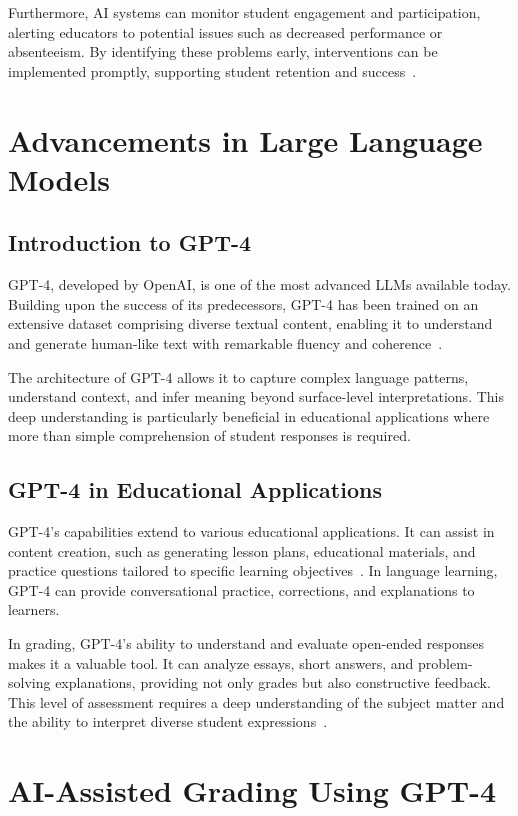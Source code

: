 \documentclass[ms,twoside,print]{nuthesis}
\begin{document}
Furthermore, AI systems can monitor student engagement and participation, alerting educators to potential issues such as decreased performance or absenteeism. By identifying these problems early, interventions can be implemented promptly, supporting student retention and success~\cite{Zawacki2021}.

\section{Advancements in Large Language Models}

\subsection{Introduction to GPT-4}

GPT-4, developed by OpenAI, is one of the most advanced LLMs available today. Building upon the success of its predecessors, GPT-4 has been trained on an extensive dataset comprising diverse textual content, enabling it to understand and generate human-like text with remarkable fluency and coherence~\cite{Alto2023}.

The architecture of GPT-4 allows it to capture complex language patterns, understand context, and infer meaning beyond surface-level interpretations. This deep understanding is particularly beneficial in educational applications where more than simple comprehension of student responses is required.

\subsection{GPT-4 in Educational Applications}

GPT-4's capabilities extend to various educational applications. It can assist in content creation, such as generating lesson plans, educational materials, and practice questions tailored to specific learning objectives~\cite{Alto2023}. In language learning, GPT-4 can provide conversational practice, corrections, and explanations to learners.

In grading, GPT-4's ability to understand and evaluate open-ended responses makes it a valuable tool. It can analyze essays, short answers, and problem-solving explanations, providing not only grades but also constructive feedback. This level of assessment requires a deep understanding of the subject matter and the ability to interpret diverse student expressions~\cite{Lund2023}.

\section{AI-Assisted Grading Using GPT-4}
\end{document}
